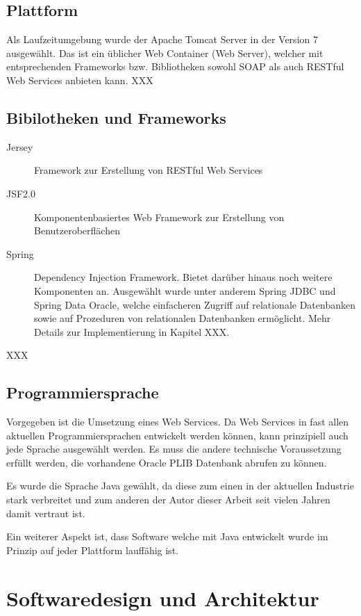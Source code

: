 \subsection{Plattform}
Als Laufzeitumgebung wurde der Apache Tomcat Server in der Version 7 ausgewählt. Das ist ein üblicher Web Container (Web Server), welcher mit entsprechenden Frameworks bzw. Bibliotheken sowohl SOAP als auch RESTful Web Services anbieten kann. 
XXX

\subsection{Bibilotheken und Frameworks} \label{bibliotheken_und_frameworks}
\begin{description}

\item[Jersey] Framework zur Erstellung von RESTful Web Services 
\item[JSF2.0] Komponentenbasiertes Web Framework zur Erstellung von Benutzeroberflächen
\item[Spring] Dependency Injection Framework. Bietet darüber hinaus noch weitere Komponenten an. Ausgewählt wurde unter anderem Spring JDBC und Spring Data Oracle, welche einfacheren Zugriff auf relationale Datenbanken sowie auf Prozeduren von relationalen Datenbanken ermöglicht. Mehr Details zur Implementierung in Kapitel XXX.  
    
\end{description}

XXX

\subsection{Programmiersprache}
Vorgegeben ist die Umsetzung eines Web Services. Da Web Services in fast allen aktuellen Programmiersprachen entwickelt werden können, kann prinzipiell auch jede Sprache ausgewählt werden. 
Es muss die andere technische Voraussetzung erfüllt werden, die vorhandene Oracle PLIB Datenbank abrufen zu können. 

Es wurde die Sprache Java gewählt, da diese zum einen in der aktuellen Industrie stark verbreitet  und zum anderen der Autor dieser Arbeit seit vielen Jahren damit vertraut ist. 

Ein weiterer Aspekt ist, dass Software welche mit Java entwickelt wurde im Prinzip auf jeder Plattform lauffähig ist. 

\section{Softwaredesign und Architektur}


